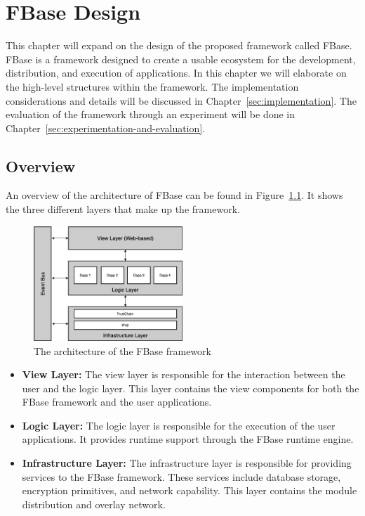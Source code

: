 \chapter{\label{sec:design}FBase Design}

This chapter will expand on the design of the proposed framework called FBase. FBase is a framework designed to create a usable ecosystem for the development, distribution, and execution of applications. In this chapter we will elaborate on the high-level structures within the framework. The implementation considerations and details will be discussed in Chapter~\ref{sec:implementation}. The evaluation of the framework through an experiment will be  done in Chapter~\ref{sec:experimentation-and-evaluation}.

\section{Overview}

An overview of the architecture of FBase can be found in Figure~\ref{fig:architecture}. It shows the three different layers that make up the framework.

\begin{figure}[h]
	\centering
	\includegraphics[width=0.5\textwidth]{images/architecture.png}
	\caption{\label{fig:architecture} The architecture of the FBase framework}
\end{figure}

\begin{itemize}
	\item \textbf{View Layer:}
	The view layer is responsible for the interaction between the user and the logic layer. This layer contains the view components for both the FBase framework and the user applications.
	
	\item \textbf{Logic Layer:} The logic layer is responsible for the execution of the user applications. It provides runtime support through the FBase runtime engine.
	
	\item \textbf{Infrastructure Layer:} The infrastructure layer is responsible for providing services to the FBase framework. These services include database storage, encryption primitives, and network capability. This layer contains the module distribution and overlay network.
\end{itemize}


